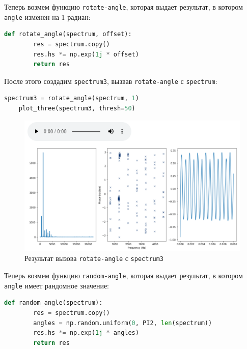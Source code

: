 \documentclass[a4paper]{article}
\begin{document}
            Теперь возмем функцию \texttt{rotate-angle}, которая выдает результат, в котором \texttt{angle} изменен на 1 радиан:
            
\begin{lstlisting}[language=Python, caption= Функция \texttt{rotate-angle}]
    def rotate_angle(spectrum, offset):
        res = spectrum.copy()
        res.hs *= np.exp(1j * offset)
        return res
\end{lstlisting} 
            
            После этого создадим \texttt{spectrum3}, вызвав \texttt{rotate-angle} с \texttt{spectrum}:
            
\begin{lstlisting}[language=Python, caption= Вызов \texttt{plot-three} с \texttt{spectrum3}]
    spectrum3 = rotate_angle(spectrum, 1)
    plot_three(spectrum3, thresh=50)
\end{lstlisting} 
            
            \begin{figure}[H]
                \centering
                \includegraphics[width=\textwidth]{ex_3_spectrum3.png}
                \caption{Результат вызова \texttt{rotate-angle} с \texttt{spectrum3}}
                \label{fig:ex_3_spectrum3}
            \end{figure}
            
            Теперь возмем функцию \texttt{random-angle}, которая выдает результат, в котором \texttt{angle} имеет рандомное значение:
            
\begin{lstlisting}[language=Python, caption= Функция \texttt{random-angle}]
    def random_angle(spectrum):
        res = spectrum.copy()
        angles = np.random.uniform(0, PI2, len(spectrum))
        res.hs *= np.exp(1j * angles)
        return res
\end{lstlisting} 
            
\end{document}
